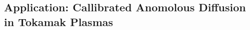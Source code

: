 \documentclass[11pt]{beamer}
\begin{document}
	
	





 
	
	

		





\subsection{Application: Callibrated Anomolous Diffusion in Tokamak Plasmas}
\end{document}
